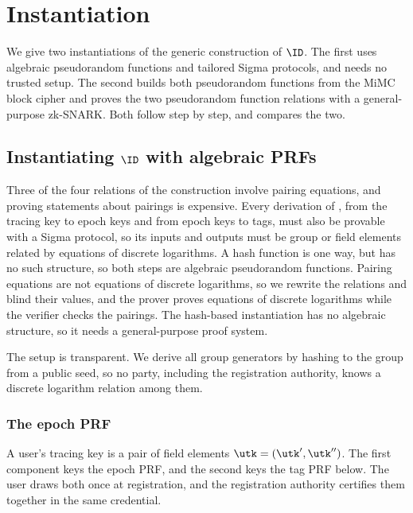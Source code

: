 \section{Instantiation}\label{sec:txid-instantiation}

We give two instantiations of the generic construction of $\ID$. The first uses
algebraic pseudorandom functions and tailored Sigma protocols, and needs no
trusted setup. The second builds both pseudorandom functions from the MiMC
block cipher and proves the two pseudorandom function relations with a
general-purpose zk-SNARK. Both follow  step by step,
and  compares the two.

\subsection{Instantiating $\ID$ with algebraic PRFs}\label{sec:txid-alg-instantiation}

Three of the four relations of the construction involve pairing equations,
and proving statements about pairings is expensive. Every derivation of
, from the tracing key to epoch keys and from epoch
keys to tags, must also be provable with a Sigma protocol, so its inputs and
outputs must be group or field elements related by equations of discrete
logarithms. A hash function is one way, but has no such structure, so both steps
are algebraic pseudorandom functions. Pairing equations are not equations of
discrete logarithms, so we rewrite the relations and blind their values, and the
prover proves equations of discrete logarithms while the verifier checks the
pairings. The hash-based instantiation has no algebraic structure, so it
needs a general-purpose proof system.

The setup is transparent. We derive all group generators by hashing to the
group from a public seed, so no party, including the registration authority,
knows a discrete logarithm relation among them.

\subsubsection{The epoch PRF}\label{sec:txid-fe}

A user's tracing key is a pair of field elements $\utk = (\utk', \utk'')$. The
first component keys the epoch PRF, and the second keys the tag PRF below. The user draws both once at registration, and the
registration authority certifies them together in the same credential.

